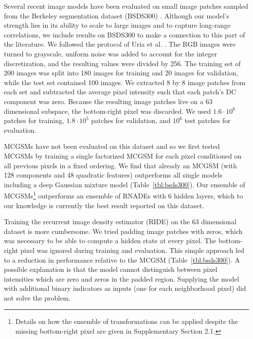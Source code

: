 \documentclass{article}
\begin{document}
Several recent image models have been evaluated on small image patches sampled from
		the Berkeley segmentation dataset (BSDS300) \cite{Martin:2001}. Although our model's
		strength lies in its ability to scale to large images and to capture long-range correlations, we include
		results on BSDS300 to make a connection to this part of the literature. We followed the
		protocol of Uria et al. \cite{Uria:2013}. The RGB images were turned to
		grayscale, uniform noise was added to account for the integer discretization, and the resulting
		values were divided by 256. The training set of 200 images was split into 180 images for
		training and 20 images for validation, while the test set contained 100 images. We extracted 8 by 8
		image patches from each set and subtracted the average pixel intensity such
		that each patch's DC component was zero. Because the resulting image patches live on a 63
		dimensional subspace, the bottom-right pixel was discarded. We used
		$1.6 \cdot 10^6$ patches for training, $1.8 \cdot 10^5$ patches for validation, and
		$10^6$ test patches for evaluation.

		MCGSMs have not been evaluated on this dataset and so we first tested MCGSMs by training a single factorized MCGSM
		for each pixel conditioned on all previous pixels in a fixed ordering. We find that already
		an MCGSM (with 128 components and 48 quadratic features) outperforms all single models
		including a deep Gaussian mixture model \cite{VanDenOord:2014a} (Table~\ref{tbl:bsds300}).
		Our ensemble of MCGSMs\footnote{Details on how the
		ensemble of transformations can be applied despite the missing bottom-right pixel are given
		in Supplementary Section 2.1.} outperforms an ensemble of RNADEs with 6 hidden layers, which to
		our knowledge is currently the best result reported on this dataset.

		Training the recurrent image density estimator (RIDE) on the 63 dimensional dataset is more cumbersome. We tried
		padding image patches with zeros, which was necessary
		to be able to compute a hidden state at every pixel. The bottom-right pixel was ignored during training and evaluation. This simple approach led to a reduction in
		performance relative to the MCGSM (Table~\ref{tbl:bsds300}). A possible explanation is that
		the model cannot distinguish between pixel intensities which are zero and zeros in the padded region.
		Supplying the model with additional binary indicators as inputs (one for each neighborhood pixel) did
		not solve the problem.
\end{document}
